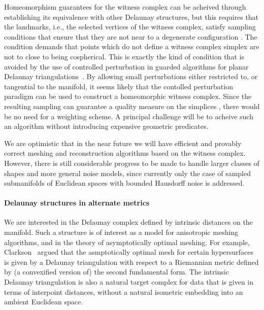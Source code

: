 Homeomorphism guarantees for the witness complex can be acheived
through establishing its equivalence with other Delaunay structures,
but this requires that the landmarks, i.e., the selected vertices of
the witness complex, satisfy sampling conditions that ensure that they
are not near to a degenerate configuration
\cite{boissonnat2011cgl,boissonnat2012stab}.  The condition demands
that points which do not define a witness complex simplex are not to
close to being cospherical. This is exactly the kind of condition that
is avoided by the use of controlled perturbation in guarded algorithms
for planar Delaunay triangulations~\cite{funke2005cp}. By allowing
small perturbations either restricted to, or tangential to the
manifold, it seems likely that the contolled perturbation paradigm can
be used to construct a homeomorphic witness complex. Since the
resulting sampling can guarantee a quality measure on the simplices
\cite{boissonnat2012stab}, there would be no need for a weighting
scheme.  A principal challenge will be to acheive such an algorithm
without introducing expensive geometric predicates.

We are optimistic that in the near future we will have efficient and
provably correct meshing and reconstruction algorithms based on the
witness complex.  However, there is still considerable progress to be
made to handle larger classes of shapes and more general noise models,
since currently only the case of sampled submanifolds of Euclidean
spaces with bounded Hausdorff noise is addressed.


\paragraph{Delaunay structures in alternate metrics}
We are interested in the Delaunay complex defined by intrinsic
distances on the manifold. Such a structure is of interest as a model
for anisotropic meshing algorithms, and in the theory of
asymptotically optimal meshing. For example,
Clarkson~\cite{clarkson2006} argued that the asmptotically optimal
mesh for certain hypersurfaces is given by a Delaunay triangulation
with respect to a Riemannian metric defined by (a convexified version
of) the second fundamental form. The intrinsic Delaunay triangulation
is also a natural target complex for data that is given in terms of
interpoint distances, without a natural isometric embedding into an
ambient Euclidean space.

